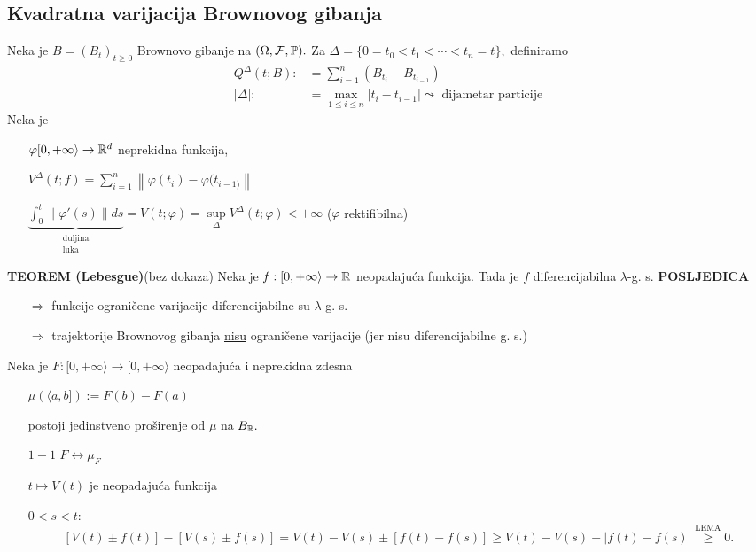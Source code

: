 \documentclass{article}
\begin{document}
\subsection{Kvadratna varijacija Brownovog gibanja}
Neka je \(B=(B_t)_{t\ge0}\) Brownovo gibanje na \((\Omega,\mathcal F,\Bbb P).\) Za \(\Delta=\{0=t_0<t_1<\cdots<t_n=t\},\) definiramo \[\begin{aligned}Q^\Delta(t;B):&=\sum_{i=1}^n\left(B_{t_i}-B_{t_{i-1}}\right)\\|\Delta|:&=\max_{1\le i\le n}|t_i-t_{i-1}|\leadsto\text{ dijametar particije}\end{aligned}\]
Neka je
\begin{enumerate}
    \item[\ding{228}] \(\varphi[0,+\infty\rangle\to\Bbb R^d\) neprekidna funkcija,
    \item[\ding{228}] \(V^\Delta(t;f)=\sum_{i=1}^n\left\|\varphi(t_i)-\varphi(t_{i-1)}\right\|\)
    \item[\ding{228}] \(\underbrace{\int_0^t\|\varphi'(s)\|ds}_{\substack{\text{duljina}\\\text{luka}}}=V(t;\varphi)=\sup\limits_\Delta V^\Delta(t;\varphi)<+\infty\) (\(\varphi\) rektifibilna)
\end{enumerate}
\textbf{TEOREM (Lebesgue)}(bez dokaza)\newline
Neka je \(f:[0,+\infty\rangle\to\Bbb R\) neopadajuća funkcija. Tada je \(f\) diferencijabilna \(\lambda\)-g. s.\newline\newline
\textbf{POSLJEDICA}
\begin{enumerate}
    \item[\(\Rightarrow\)] funkcije ograničene varijacije diferencijabilne su \(\lambda\)-g. s.
    \item[\(\Rightarrow\)] trajektorije Brownovog gibanja \underline{nisu} ograničene varijacije  (jer nisu diferencijabilne g. s.) 
\end{enumerate}
Neka je \(F:[0,+\infty\rangle\to[0,+\infty\rangle\)  neopadajuća i neprekidna zdesna
\begin{enumerate}
    \item[\ding{228}] \(\mu\left(\langle a,b]\right):=F(b)-F(a)\)
    \item[\ding{228}] postoji jedinstveno proširenje od \(\mu\) na \(B_\Bbb R.\)
    \item[\ding{228}] \(1-1\) \(F\leftrightarrow\mu_F\)
    \item[\ding{228}] \(t\mapsto V(t)\) je neopadajuća funkcija
    \item[\ding{228}] \(0<s<t\): \[[V(t)\pm f(t)]-[V(s)\pm f(s)]=V(t)-V(s)\pm[f(t)-f(s)
    ]\ge V(t)-V(s)-|f(t)-f(s)|\overset{\text{LEMA}}{\ge}0.\] 
\end{enumerate}
\end{document}
